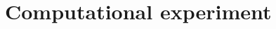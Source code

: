 \documentclass[12pt, twoside]{article}
\begin{document}
\section{Computational experiment}

\end{document}
